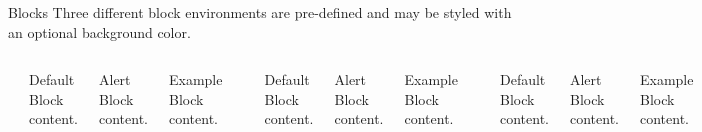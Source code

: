 \documentclass[aspectratio=169]{beamer}
\begin{document}
	\begin{frame}[fragile]{Blocks}
		Three different block environments are pre-defined and may be styled with an optional background color.

		\begin{columns}[T,onlytextwidth]
			\begin{verbatim}
				\gothamset{
					block=native}
			\end{verbatim}

			\begin{block}{Default}
				Block content.
			\end{block}

			\begin{alertblock}{Alert}
				Block content.
			\end{alertblock}

			\begin{exampleblock}{Example}
				Block content.
			\end{exampleblock}


			\begin{verbatim}
				\gothamset{
					block=transparent}
			\end{verbatim}

			\begin{block}{Default}
				Block content.
			\end{block}

			\begin{alertblock}{Alert}
				Block content.
			\end{alertblock}

			\begin{exampleblock}{Example}
				Block content.
			\end{exampleblock}


			\begin{verbatim}
				\gothamset{
					block=fill}
			\end{verbatim}

			\begin{block}{Default}
				Block content.
			\end{block}

			\begin{alertblock}{Alert}
				Block content.
			\end{alertblock}

			\begin{exampleblock}{Example}
				Block content.
			\end{exampleblock}

		\end{columns}
	\end{frame}
\end{document}
